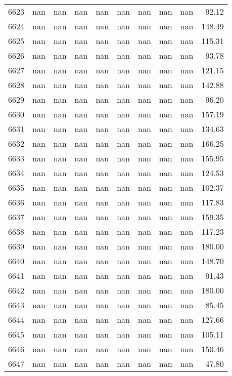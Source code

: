 \begin{tabular}{lrrrrrrrrr}
6623 & nan & nan & nan & nan & nan & nan & nan & nan & 92.12 \\
6624 & nan & nan & nan & nan & nan & nan & nan & nan & 148.49 \\
6625 & nan & nan & nan & nan & nan & nan & nan & nan & 115.31 \\
6626 & nan & nan & nan & nan & nan & nan & nan & nan & 93.78 \\
6627 & nan & nan & nan & nan & nan & nan & nan & nan & 121.15 \\
6628 & nan & nan & nan & nan & nan & nan & nan & nan & 142.88 \\
6629 & nan & nan & nan & nan & nan & nan & nan & nan & 96.20 \\
6630 & nan & nan & nan & nan & nan & nan & nan & nan & 157.19 \\
6631 & nan & nan & nan & nan & nan & nan & nan & nan & 134.63 \\
6632 & nan & nan & nan & nan & nan & nan & nan & nan & 166.25 \\
6633 & nan & nan & nan & nan & nan & nan & nan & nan & 155.95 \\
6634 & nan & nan & nan & nan & nan & nan & nan & nan & 124.53 \\
6635 & nan & nan & nan & nan & nan & nan & nan & nan & 102.37 \\
6636 & nan & nan & nan & nan & nan & nan & nan & nan & 117.83 \\
6637 & nan & nan & nan & nan & nan & nan & nan & nan & 159.35 \\
6638 & nan & nan & nan & nan & nan & nan & nan & nan & 117.23 \\
6639 & nan & nan & nan & nan & nan & nan & nan & nan & 180.00 \\
6640 & nan & nan & nan & nan & nan & nan & nan & nan & 148.70 \\
6641 & nan & nan & nan & nan & nan & nan & nan & nan & 91.43 \\
6642 & nan & nan & nan & nan & nan & nan & nan & nan & 180.00 \\
6643 & nan & nan & nan & nan & nan & nan & nan & nan & 85.45 \\
6644 & nan & nan & nan & nan & nan & nan & nan & nan & 127.66 \\
6645 & nan & nan & nan & nan & nan & nan & nan & nan & 105.11 \\
6646 & nan & nan & nan & nan & nan & nan & nan & nan & 150.46 \\
6647 & nan & nan & nan & nan & nan & nan & nan & nan & 47.80 \\

\end{tabular}

